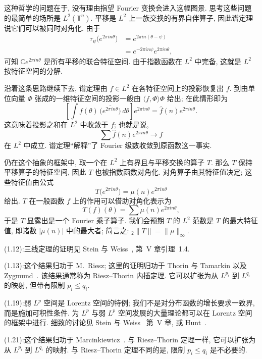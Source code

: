 这种哲学的问题在于, 没有理由指望 Fourier 变换会进入这幅图景. 思考这些问题的最简单的场所是 $L^2(\mathbb{T}^n)$. 平移是 $L^2$ 上一族交换的有界自伴算子, 因此谱定理说它们可以被同时对角化. 由于
\begin{align*}
\tau_{\psi}\bigl(e^{2\pi in\theta}\bigr)&=e^{2\pi in(\theta-\psi)} \\
&=e^{-2\pi in\psi}e^{2\pi in\theta},
\end{align*}
可知 $\mathbb{C}e^{2\pi in\theta}$ 是所有平移的联合特征空间. 由于指数函数在 $L^2$ 中完备, 这就是 $L^2$ 按特征空间的分解.

沿着这条思路继续下去, 谱定理由 $f\in L^2$ 在各特征空间上的投影恢复出 $f$. 到由单位向量 $\Phi$ 张成的一维特征空间的投影一般由 $\langle f,\Phi\rangle\Phi$ 给出; 在此情形即为
\[
\left[\int f(\theta)\,\overline{\bigl(e^{2\pi in\theta}\bigr)}\,d\theta\right]e^{2\pi in\theta}=\hat{f}(n)e^{2\pi in\theta}.
\]
这意味着投影之和在 $L^2$ 中收敛于 $f$; 也就是说,
\[
\sum\hat{f}(n)e^{2\pi in\theta}\to f
\]
在 $L^2$ 中成立. 谱定理``解释''了 Fourier 级数收敛到原函数这一事实.

仍在这个抽象的框架中, 取一个在 $L^2$ 上有界且与平移交换的算子 $T$. 那么 $T$ 保持平移算子的特征空间, 因此 $T$ 也被指数函数对角化. 对角算子由其特征值决定; 这些特征值由公式
\[
T\bigl(e^{2\pi in\theta}\bigr)=\mu(n)e^{2\pi in\theta}
\]
给出. $T$ 在一般函数 $f$ 上的作用可以借助对角化表示为
\[
T(f)(\theta)=\sum\mu(n)e^{2\pi in\theta},
\]
于是 $T$ 显露出是一个 Fourier 乘子算子. 我们会预期 $T$ 的 $L^2$ 范数是 $T$ 的最大特征值, 即诸数 $|\mu(n)|$ 中的最大者; 简言之: ${}_2\|T\|=\|\mu\|_{\infty}$.

\noindent (1.12):\quad 三线定理的证明见 Stein 与 Weiss~\cite{steinweiss}, 第~V 章引理~1.4.

\noindent (1.13):\quad 这个结果归功于 M.~Riesz; 这里的证明归功于 Thorin 与 Tamarkin 以及 Zygmund~\cite{zygmund}. 该结果通常称为 Riesz--Thorin 内插定理. 它可以扩张为从 $L^{p_i}$ 到 $L^{q_i}$ 的映射, 但带有限制 $p_i\leq q_i$.

\noindent (1.19):\quad 弱 $L^p$ 空间是 Lorentz 空间的特例; 我们不是对分布函数的增长要求一致界, 而是施加可积性条件. 为 $L^p$ 与弱 $L^p$ 空间发展的大量理论都可以在 Lorentz 空间的框架中进行. 细致的讨论见 Stein 与 Weiss~\cite{steinweiss} 第~V 章, 或 Hunt~\cite{hunt}.

\noindent (1.21):\quad 这个结果归功于 Marcinkiewicz~\cite{marcinkiewicz-multipliers}. 与 Riesz--Thorin 定理一样, 它可以扩张为从 $L^{p_i}$ 到 $L^{q_i}$ 的映射. 与 Riesz--Thorin 定理不同的是, 限制 $p_i\leq q_i$ 是不必要的.

